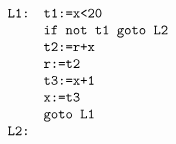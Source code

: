 \documentclass{jarticle}
\begin{document}
\[
 \begin{array}{ll}
  \verb|L1:| & \verb|t1:=x<20|\\
  & \verb|if not t1 goto L2|\\
  & \verb|t2:=r+x|\\
  & \verb|r:=t2|\\
  & \verb|t3:=x+1|\\
  & \verb|x:=t3|\\
  & \verb|goto L1|\\
\verb|L2:| &
 \end{array}
\]
\end{document}
